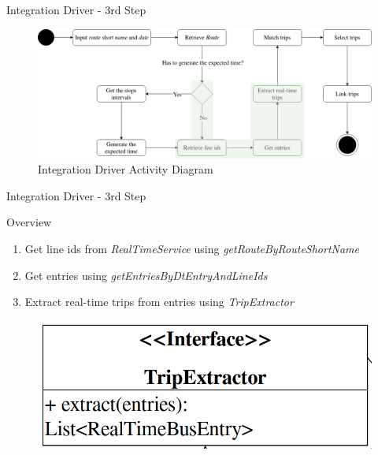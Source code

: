 \documentclass[xcolor=dvipsnames,table]{beamer}
\begin{document}
\begin{frame}{Integration Driver - 3rd Step}
        \begin{figure}[H]
                \centering
                \includegraphics[width = \textwidth]{images/integrationDriverAD(3rd_step).png}
                \caption{Integration Driver Activity Diagram}
        \end{figure}
\end{frame}
\begin{frame}{Integration Driver - 3rd Step}
        \begin{block}{Overview}
                \begin{enumerate}
                        \item Get line ids from \textit{RealTimeService} using \textit{getRouteByRouteShortName}
                        \item Get entries using \textit{getEntriesByDtEntryAndLineIds}
                        \item Extract real-time trips from entries using \textit{TripExtractor}
                \end{enumerate}
        \end{block}
        \begin{figure}[H]
                \centering
                \includegraphics[scale=0.25]{images/TripExtractor.png}
        \end{figure}
\end{frame}
\end{document}
